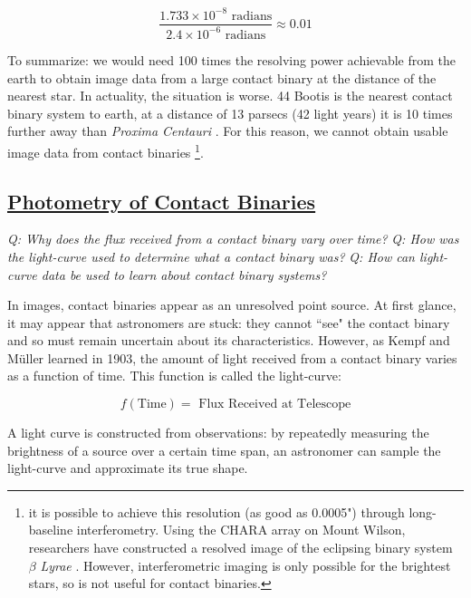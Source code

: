 \documentclass[12pt]{article} %
\numberwithin{equation}{section} %
\begin{document}
\begin{equation} \label{eqn: resolution_comparison}
\frac{1.733 \times 10^{-8} \text{ radians}}{2.4 \times 10^{-6} \text{ radians}} \approx 0.01
\end{equation}

To summarize: we would need 100 times the resolving power achievable from the earth to obtain image data from a large contact binary at the distance of the nearest star. In actuality, the situation is worse. 44 Bootis is the nearest contact binary system to earth, at a distance of 13 parsecs (42 light years) it is 10 times further away than \emph{Proxima Centauri} \citep{eker2008new}. For this reason, we cannot obtain usable image data from contact binaries \footnote{it is possible to achieve this resolution (as good as 0.0005") through long-baseline interferometry. Using the CHARA array on Mount Wilson, researchers have constructed a resolved image of the eclipsing binary system $\beta$ \emph{Lyrae}  \citep{zhao2008first}. However, interferometric imaging is only possible for the brightest stars, so is not useful for contact binaries.}.

\subsection[Photometry of Contact Binaries]{\hyperlink{toc}{Photometry of Contact Binaries}} \label{sec: Photometry of Contact Binaries}

\emph{Q: Why does the flux received from a contact binary vary over time?}
\emph{Q: How was the light-curve used to determine what a contact binary was?}
\emph{Q: How can light-curve data be used to learn about contact binary systems? }

In images, contact binaries appear as an unresolved point source. At first glance, it may appear that astronomers are stuck: they cannot ``see" the contact binary and so must remain uncertain about its characteristics. However, as Kempf and M\"{u}ller learned in 1903, the amount of light received from a contact binary varies as a function of time. This function is called the light-curve: 

\begin{equation} \label{eqn: light_curve}
f(\text{Time}) = \text{ Flux Received at Telescope}
\end{equation}

A light curve is constructed from observations: by repeatedly measuring the brightness of a source over a certain time span, an astronomer can sample the light-curve and approximate its true shape.
\end{document}
